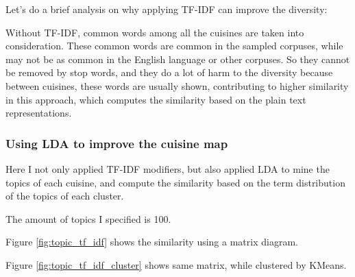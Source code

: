 \documentclass[11pt]{article}
\begin{document}
Let's do a brief analysis on why applying TF-IDF can improve the diversity:

Without TF-IDF, common words among all the cuisines are taken into consideration. These common words are common in the sampled corpuses, while may not be as common in the English language or other corpuses. So they cannot be removed by stop words, and they do a lot of harm to the diversity because between cuisines, these words are usually shown, contributing to higher similarity in this approach, which computes the similarity based on the plain text representations.

\subsubsection{Using LDA to improve the cuisine map}
Here I not only applied TF-IDF modifiers, but also applied LDA to mine the topics of each cuisine, and compute the similarity based on the term distribution of the topics of each cluster.

The amount of topics I specified is 100.

\vspace{1em}
Figure \ref{fig:topic_tf_idf} shows the similarity using a matrix diagram.

Figure \ref{fig:topic_tf_idf_cluster} shows same matrix, while clustered by KMeans.
\end{document}
